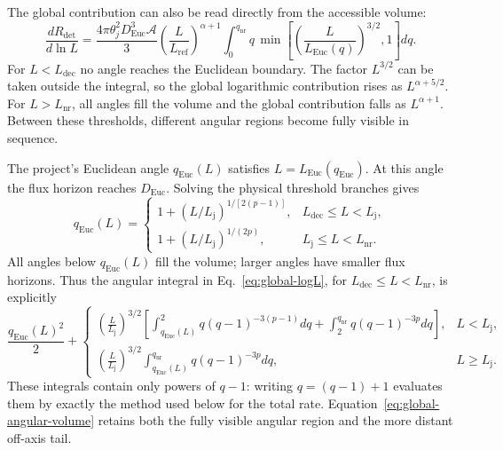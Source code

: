 \documentclass[11pt,a4paper]{article}
\newcommand{\Euc}{\mathrm{Euc}}
\newcommand{\nr}{\mathrm{nr}}
\newcommand{\Lref}{L_{\mathrm{ref}}}
\newcommand{\Ldec}{L_{\mathrm{dec}}}
\newcommand{\Lj}{L_{\mathrm j}}
\newcommand{\Lnr}{L_{\mathrm{nr}}}
\newcommand{\Rdet}{R_{\mathrm{det}}}
\begin{document}
The global contribution can also be read directly from the accessible volume:
\begin{equation}
 \frac{d\Rdet}{d\ln L}=
 \frac{4\pi\theta_j^2D_\Euc^3\mathcal A}{3}
 \left(\frac L{\Lref}\right)^{\alpha+1}
 \int_0^{q_\nr}q\,
 \min\!\left[\left(\frac L{L_\Euc(q)}\right)^{3/2},1\right]dq.
 \label{eq:global-logL}
\end{equation}
For $L<\Ldec$ no angle reaches the Euclidean boundary. The factor
$L^{3/2}$ can be taken outside the integral, so the global logarithmic
contribution rises as $L^{\alpha+5/2}$. For $L>\Lnr$, all angles fill the
volume and the global contribution falls as $L^{\alpha+1}$.
Between these thresholds, different angular regions become fully visible
in sequence.

The project's Euclidean angle $q_\Euc(L)$ satisfies $L=L_\Euc(q_\Euc)$.
At this angle the flux horizon reaches $D_\Euc$. Solving the physical
threshold branches gives
\begin{equation}
 q_\Euc(L)=\begin{cases}
 1+(L/\Lj)^{1/[2(p-1)]},&\Ldec\le L<\Lj,\\
 1+(L/\Lj)^{1/(2p)},&\Lj\le L<\Lnr.
 \end{cases}
 \label{eq:qEuc-L}
\end{equation}
All angles below $q_\Euc(L)$ fill the volume; larger angles have smaller
flux horizons. Thus the angular integral in Eq.~\eqref{eq:global-logL},
for $\Ldec\le L<\Lnr$, is explicitly
\begin{equation}
 \frac{q_\Euc(L)^2}{2}+
 \begin{cases}
 \displaystyle
 \left(\frac L{\Lj}\right)^{3/2}
 \left[\int_{q_\Euc(L)}^2 q(q-1)^{-3(p-1)}dq
       +\int_2^{q_\nr}q(q-1)^{-3p}dq\right],
       &L<\Lj,\\[8pt]
 \displaystyle
 \left(\frac L{\Lj}\right)^{3/2}
 \int_{q_\Euc(L)}^{q_\nr}q(q-1)^{-3p}dq,
       &L\ge\Lj.
 \end{cases}
 \label{eq:global-angular-volume}
\end{equation}
These integrals contain only powers of $q-1$: writing $q=(q-1)+1$
evaluates them by exactly the method used below for the total rate.
Equation~\eqref{eq:global-angular-volume} retains both the fully visible
angular region and the more distant off-axis tail.
\end{document}
